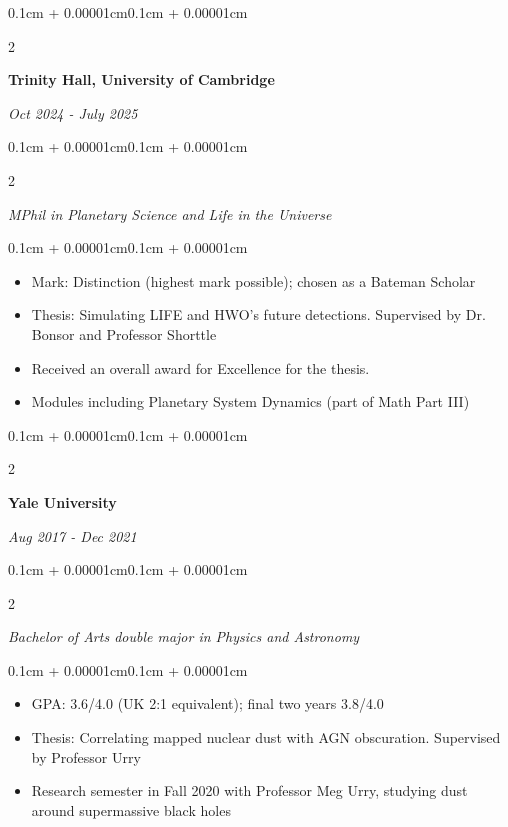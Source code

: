 \documentclass[10pt,letterpaper]{article}
\newenvironment{highlights}{
    \begin{itemize}[
        topsep=0.1cm,
        parsep=0.1cm,
        partopsep=0pt,
        itemsep=0pt,
        leftmargin=0.4cm + 10pt
    ]
}{
    \end{itemize}
}
\newenvironment{onecolentry}{
    \begin{adjustwidth}{0.1cm + 0.00001cm}{0.1cm + 0.00001cm}
}{
    \end{adjustwidth}
}
\newenvironment{twocolentry}[2][]{
    \onecolentry
    \def\secondColumn{#2}
    \setcolumnwidth{\fill,4.5cm}
    \begin{paracol}{2}
}{
    \switchcolumn \raggedleft \secondColumn
    \end{paracol}
    \endonecolentry
}
\begin{document}
        \vspace{0.20 cm}
        \begin{twocolentry}{
        \textit{Oct 2024 - July 2025}}
            \textbf{Trinity Hall, University of Cambridge}
        \end{twocolentry} \begin{twocolentry}{
        \textit{}}
            \textit{MPhil in Planetary Science and Life in the Universe}
        \end{twocolentry}
        \begin{onecolentry}
            \begin{highlights}
                \item Mark: Distinction (highest mark possible); chosen as a Bateman Scholar
                \item Thesis: Simulating LIFE and HWO's future detections. Supervised by Dr. Bonsor and Professor Shorttle
                \item Received an overall award for Excellence for the thesis. 
                \item Modules including Planetary System Dynamics (part of Math Part III)

            \end{highlights}
        \end{onecolentry}
        \vspace{0.20 cm}
        
        \begin{twocolentry}{
        \textit{Aug 2017 - Dec 2021}}
            \textbf{Yale University}
        \end{twocolentry} \begin{twocolentry}{
        \textit{}}
            \textit{Bachelor of Arts double major in Physics and Astronomy}
        \end{twocolentry}
        \vspace{0.10 cm}
        \begin{onecolentry}
            \begin{highlights}
                \item GPA: 3.6/4.0 (UK 2:1 equivalent); final two years 3.8/4.0
                \item Thesis: Correlating mapped nuclear dust with AGN obscuration. Supervised by Professor Urry
                \item Research semester in Fall 2020 with Professor Meg Urry, studying dust around supermassive black holes
            \end{highlights}
        \end{onecolentry}
        \vspace{0.20 cm}
        
\end{document}
